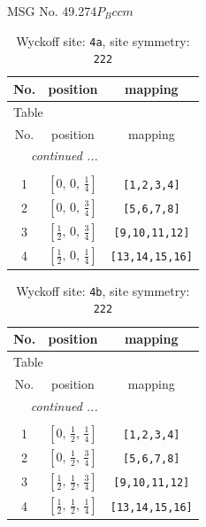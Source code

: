 \documentclass[fleqn,8pt]{jsarticle}
\begin{document}
\setcounter{MaxMatrixCols}{32}

\renewcommand{\tablename}{Table~}
\renewcommand{\figurename}{Figure~}
\begin{center}
\LARGE
MSG No. 49.274\quad$P_{B}ccm$
\end{center}
\renewcommand{\arraystretch}{1.2}
\begin{longtable}{ccc}
\caption{Wyckoff site: {\tt 4a}, site symmetry: {\tt 222}}
 \\
 \hline \hline
No. & position & mapping \\ \hline \endfirsthead

\multicolumn{2}{l}{\tablename\ \thetable{}} \\
 \hline \hline
No. & position & mapping \\ \hline \endhead

 \hline \hline
\multicolumn{2}{r}{\footnotesize\it continued ...} \\ \endfoot

 \hline \hline
\multicolumn{2}{r}{} \\ \endlastfoot

1 & $\left[ 0,\, 0,\, \frac{1}{4} \right]$ & {\tt [1,2,3,4]} \\ \hline
2 & $\left[ 0,\, 0,\, \frac{3}{4} \right]$ & {\tt [5,6,7,8]} \\ \hline
3 & $\left[ \frac{1}{2},\, 0,\, \frac{3}{4} \right]$ & {\tt [9,10,11,12]} \\ \hline
4 & $\left[ \frac{1}{2},\, 0,\, \frac{1}{4} \right]$ & {\tt [13,14,15,16]} \\
\end{longtable}
\renewcommand{\arraystretch}{1.2}
\begin{longtable}{ccc}
\caption{Wyckoff site: {\tt 4b}, site symmetry: {\tt 222}}
 \\
 \hline \hline
No. & position & mapping \\ \hline \endfirsthead

\multicolumn{2}{l}{\tablename\ \thetable{}} \\
 \hline \hline
No. & position & mapping \\ \hline \endhead

 \hline \hline
\multicolumn{2}{r}{\footnotesize\it continued ...} \\ \endfoot

 \hline \hline
\multicolumn{2}{r}{} \\ \endlastfoot

1 & $\left[ 0,\, \frac{1}{2},\, \frac{1}{4} \right]$ & {\tt [1,2,3,4]} \\ \hline
2 & $\left[ 0,\, \frac{1}{2},\, \frac{3}{4} \right]$ & {\tt [5,6,7,8]} \\ \hline
3 & $\left[ \frac{1}{2},\, \frac{1}{2},\, \frac{3}{4} \right]$ & {\tt [9,10,11,12]} \\ \hline
4 & $\left[ \frac{1}{2},\, \frac{1}{2},\, \frac{1}{4} \right]$ & {\tt [13,14,15,16]} \\
\end{longtable}
\end{document}

